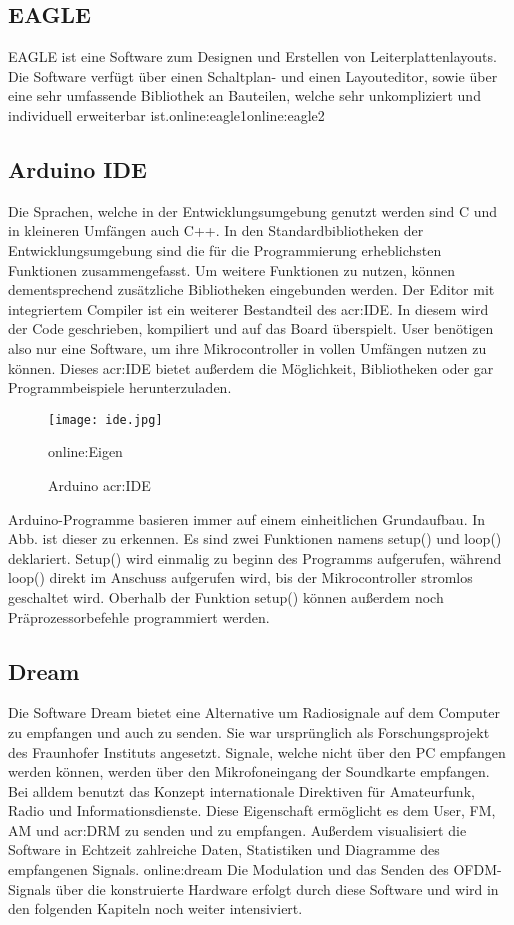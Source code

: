 \subsection{EAGLE}
\label{subsec:eagle}

EAGLE ist eine Software zum Designen und Erstellen von Leiterplattenlayouts. Die Software verfügt über einen Schaltplan- und einen Layouteditor, sowie über eine sehr umfassende Bibliothek an Bauteilen, welche sehr unkompliziert und individuell erweiterbar ist.\gls{online:eagle1}\gls{online:eagle2}


\subsection{Arduino IDE}
\label{subsec:ide}

Die Sprachen, welche in der Entwicklungsumgebung genutzt werden sind C und in kleineren Umfängen auch C++. In den Standardbibliotheken der Entwicklungsumgebung sind die für die Programmierung erheblichsten Funktionen zusammengefasst. Um weitere Funktionen zu nutzen, können dementsprechend zusätzliche Bibliotheken eingebunden werden. 
Der Editor mit integriertem Compiler ist ein weiterer Bestandteil des \gls{acr:IDE}. In diesem wird der Code geschrieben, kompiliert und auf das Board überspielt. User benötigen also nur eine Software, um ihre Mikrocontroller in vollen Umfängen nutzen zu können. Dieses \gls{acr:IDE} bietet außerdem die Möglichkeit, Bibliotheken oder gar Programmbeispiele herunterzuladen.\cite{arduino}

\begin{figure}[H]
	\centering
	\texttt{[image: ide.jpg]}
	\caption[Arduino \gls{acr:IDE}]{Arduino \gls{acr:IDE}}\gls{online:Eigen}
	\label{fig:ide}
\end{figure}

Arduino-Programme basieren immer auf einem einheitlichen Grundaufbau. In Abb. ist
dieser zu erkennen. Es sind zwei Funktionen namens setup() und loop() deklariert.
Setup() wird einmalig zu beginn des Programms aufgerufen, während loop() direkt im Anschuss aufgerufen wird, bis der Mikrocontroller stromlos geschaltet wird. Oberhalb der Funktion setup() können außerdem noch Präprozessorbefehle programmiert werden.

\subsection{Dream}
\label{subsec:dreamsoft}
Die Software Dream bietet eine Alternative um Radiosignale auf dem Computer zu empfangen und auch zu senden. Sie war ursprünglich als Forschungsprojekt des Fraunhofer Instituts angesetzt. Signale, welche nicht über den PC empfangen werden können, werden über den Mikrofoneingang der Soundkarte empfangen.
Bei alldem benutzt das Konzept internationale Direktiven für Amateurfunk, Radio und Informationsdienste.
Diese Eigenschaft ermöglicht es dem User, FM, AM und \gls{acr:DRM} zu senden und zu empfangen. Außerdem visualisiert die Software in Echtzeit zahlreiche Daten, Statistiken und Diagramme des empfangenen Signals. \gls{online:dream} Die Modulation und das Senden des OFDM-Signals über die konstruierte Hardware erfolgt durch diese Software und wird in den folgenden Kapiteln noch weiter intensiviert.